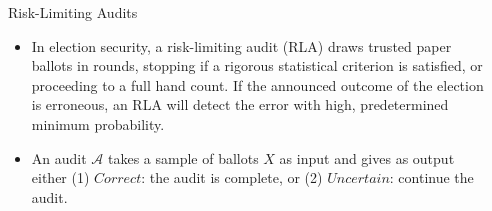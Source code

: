 \documentclass[final]{beamer}
\newcommand{\Minerva}{\textsc{Minerva}\xspace}
\newlength{\sepwidth}
\newlength{\colwidth}
\newcommand{\separatorcolumn}{\begin{column}{\sepwidth}\end{column}}
\begin{document}
\begin{frame}[t]
\begin{columns}[t]
\separatorcolumn

\begin{column}{\colwidth}

\begin{block}{Risk-Limiting Audits}
\begin{itemize}
\item
In election security, a risk-limiting audit (RLA) draws trusted paper ballots in rounds, stopping if a rigorous statistical criterion is satisfied, or proceeding to a full hand count. If the announced outcome of the election is erroneous, an RLA will detect the error with high, predetermined minimum probability. 

\item
An audit $\mathcal{A}$ takes a sample of ballots $X$ as input and gives as output either
(1) $Correct$: the audit is complete, or (2) $Uncertain$: continue the audit.

%




\end{itemize}
\end{block}
\end{column}
\end{columns}
\end{frame}
\end{document}
